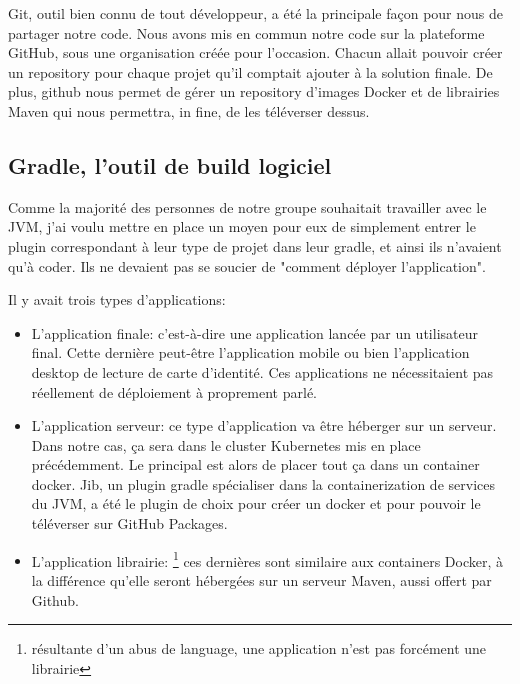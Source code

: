 Git, outil bien connu de tout développeur, a été la principale façon pour nous de partager notre code. Nous avons mis en commun notre code sur la plateforme GitHub, sous une organisation créée pour l'occasion. Chacun allait pouvoir créer un repository pour chaque projet qu'il comptait ajouter à la solution finale. De plus, github nous permet de gérer un repository d'images Docker et de librairies Maven qui nous permettra, in fine, de les téléverser dessus.

\subsection{Gradle, l'outil de build logiciel}

Comme la majorité des personnes de notre groupe souhaitait travailler avec le JVM, j'ai voulu mettre en place un moyen pour eux de simplement entrer le plugin correspondant à leur type de projet dans leur gradle, et ainsi ils n'avaient qu'à coder. Ils ne devaient pas se soucier de "comment déployer l'application".

Il y avait trois types d'applications:

\begin{itemize}
    \item L'application finale: c'est-à-dire une application lancée par un utilisateur final. Cette dernière peut-être l'application mobile ou bien l'application desktop de lecture de carte d'identité. Ces applications ne nécessitaient pas réellement de déploiement à proprement parlé.
    \item L'application serveur: ce type d'application va être héberger sur un serveur. Dans notre cas, ça sera dans le cluster Kubernetes mis en place précédemment. Le principal est alors de placer tout ça dans un container docker. Jib, un plugin gradle spécialiser dans la containerization de services du JVM, a été le plugin de choix pour créer un docker et pour pouvoir le téléverser sur GitHub Packages.
    \item L'application librairie: \footnote{résultante d'un abus de language, une application n'est pas forcément une librairie} ces dernières sont similaire aux containers Docker, à la différence qu'elle seront hébergées sur un serveur Maven, aussi offert par Github.
\end{itemize}
